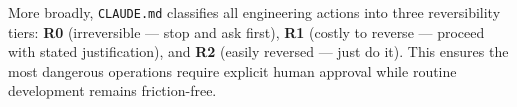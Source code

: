 \documentclass[11pt,a4paper]{article}
\begin{document}
More broadly, \texttt{CLAUDE.md} classifies all engineering actions into three
reversibility tiers: \textbf{R0} (irreversible — stop and ask first),
\textbf{R1} (costly to reverse — proceed with stated justification), and
\textbf{R2} (easily reversed — just do it). This ensures the most dangerous operations
require explicit human approval while routine development remains friction-free.
\end{document}
